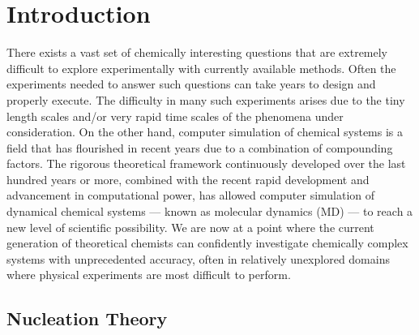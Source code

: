 \documentclass[titlepage,11pt]{article}
\begin{document}

\justifying
\doublespacing

\section{Introduction}

There exists a vast set of chemically interesting questions that are extremely difficult to explore experimentally with currently available methods. Often the experiments needed to answer such questions can take years to design and properly execute. The difficulty in many such experiments arises due to the tiny length scales and/or very rapid time scales of the phenomena under consideration. On the other hand, computer simulation of chemical systems is a field that has flourished in recent years due to a combination of compounding factors. The rigorous theoretical framework continuously developed over the last hundred years or more, combined with the recent rapid development and advancement in computational power, has allowed computer simulation of dynamical chemical systems --- known as molecular dynamics (MD) --- to reach a new level of scientific possibility. We are now at a point where the current generation of theoretical chemists can confidently investigate chemically complex systems with unprecedented accuracy, often in relatively unexplored domains where physical experiments are most difficult to perform.

\subsection{Nucleation Theory}
\end{document}
